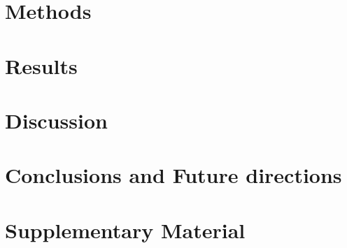 \documentclass{article}
\begin{document}
\section{Methods}



\section{Results}



\section{Discussion}

%

\section{Conclusions and Future directions}

%

\newpage 



\newpage 
\section{Supplementary Material }

%
\end{document}
